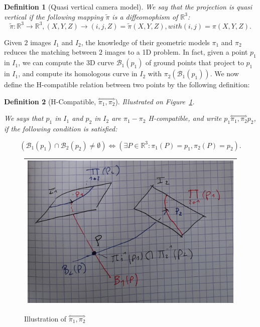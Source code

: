 \documentclass{ipol}
\newcommand{\RR}{\ensuremath{\mathbb{R}}}
\newcommand{\HComp}{\overset{\Longleftrightarrow}{\scriptscriptstyle \pi_1,\pi_2}}
\newcommand{\Bund}[1]{\ensuremath{\mathcal{B}_{#1}}}
\newcommand{\BundO}{\Bund{1}}
\newcommand{\BundT}{\Bund{2}}
\newcommand{\PiVert}{\widetilde{\pi}}
\newtheorem{definition}{Definition}
\begin{document}
\begin{definition}[Quasi vertical camera model]  
We say that the projection is quasi vertical if the following mapping $\PiVert$ is a diffeomophism of $\RR^3$:
\begin{equation}
  \PiVert :  \RR^3  \rightarrow \RR^3  ,  (X,Y,Z)  \rightarrow (i,j,Z) = \PiVert(X,Y,Z)  , with (i,j) = \pi(X,Y,Z). \label{PiInvert}
\end{equation}
\end{definition}

\noindent Given $2$ images $I_1$ and $I_2$, the knowledge  of their geometric models $\pi_1$ and  $\pi_2$
reduces the matching between $2$ images to a 1D problem. In fact, given a point $p_1$ in $I_1$,
we can compute the 3D curve $\BundO(p_1)$ of  ground points that project to $p_1$ in $I_1$, and compute its
homologous curve in $I_2$ with $\pi_2(\BundO(p_1))$. We now define the H-compatible relation between two points
by the following definition:

\begin{definition}[H-Compatible, $\HComp$] 
\emph{Illustrated on Figure~\ref{FigNotaComp}.}

We says that $p_1$ in  $I_1$ and $p_2$ in $I_2$ are  $\pi_1-\pi_2$ H-compatible, and write $p_1 \HComp p_2$, if   the following condition is satisfied:

\begin{equation}
   ( \BundO(p_1) \cap  \BundT(p_2) \neq \emptyset    )
    \Leftrightarrow
  (\exists P \in  \RR^3 : \pi_1(P) =p_1 ,  \pi_2(P) = p_2).
\end{equation}
\end{definition}

\begin{figure}
\centering
\begin{tabular}{||c||}
 \hline \hline
\includegraphics[width=15cm]{FIGS/NotaBundle.jpg} 
 \\ \hline \hline
\end{tabular}
\caption{Illustration of $\HComp$}
\label{FigNotaComp}
\end{figure}
\end{document}
